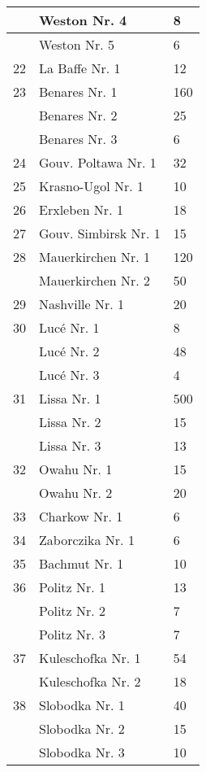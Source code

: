\documentclass[a4paper, 11pt, oneside, polutonikogreek, german]{article}
\begin{document}
\begin{center}
\begin{longtable}{|l|l|l|}
          & Weston Nr. 4 & 8 \\ \hline
          & Weston Nr. 5 & 6 \\ \hline
        22 & La Baffe Nr. 1 & 12 \\ \hline
        23 & Benares Nr. 1 & 160 \\ \hline
          & Benares Nr. 2 & 25 \\ \hline
          & Benares Nr. 3 & 6 \\ \hline
        24 & Gouv. Poltawa Nr. 1 & 32 \\ \hline
        25 & Krasno-Ugol Nr. 1 & 10 \\ \hline
        26 & Erxleben Nr. 1 & 18 \\ \hline
        27 & Gouv. Simbirsk Nr. 1 & 15 \\ \hline
        28 & Mauerkirchen Nr. 1 & 120 \\ \hline
          & Mauerkirchen Nr. 2 & 50 \\ \hline
        29 & Nashville Nr. 1 & 20 \\ \hline
        30 & Lucé Nr. 1 & 8 \\ \hline
          & Lucé Nr. 2 & 48 \\ \hline
          & Lucé Nr. 3 & 4 \\ \hline
        31 & Lissa Nr. 1 & 500 \\ \hline
          & Lissa Nr. 2 & 15 \\ \hline
          & Lissa Nr. 3 & 13 \\ \hline
        32 & Owahu Nr. 1 & 15 \\ \hline
          & Owahu Nr. 2 & 20 \\ \hline
        33 & Charkow Nr. 1 & 6 \\ \hline
        34 & Zaborczika Nr. 1 & 6 \\ \hline
        35 & Bachmut Nr. 1 & 10 \\ \hline
        36 & Politz Nr. 1 & 13 \\ \hline
          & Politz Nr. 2 & 7 \\ \hline
          & Politz Nr. 3 & 7 \\ \hline
        37 & Kuleschofka Nr. 1 & 54 \\ \hline
          & Kuleschofka Nr. 2 & 18 \\ \hline
        38 & Slobodka Nr. 1 & 40 \\ \hline
          & Slobodka Nr. 2 & 15 \\ \hline
          & Slobodka Nr. 3 & 10 \\ \hline

\end{longtable}
\end{center}
\end{document}
